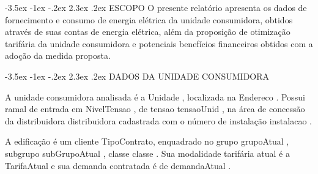 \documentclass[a4paper,12pt]{abntex2}
\makeatletter
\renewcommand\chapter{\@startsection{chapter}{0}{\z@}%
  {-3.5ex \@plus -1ex \@minus -.2ex}%
  {2.3ex \@plus.2ex}%
  {\normalfont\large\bfseries}}
\renewcommand{\arraystretch}{1.3}
\makeatother
\begin{document}
    \begin{table}[!ht]
        \centering
        \setlength{\tabcolsep}{5pt}
        \renewcommand{\arraystretch}{1.3}
    \end{table} 
    \vfill
    
    \newpage

\chapter{ESCOPO}
O presente relatório apresenta os dados de fornecimento e consumo de energia elétrica da unidade consumidora, obtidos através de suas contas de energia elétrica, além da proposição de otimização tarifária da unidade consumidora e potenciais benefícios financeiros obtidos com a adoção da medida proposta.

\chapter{DADOS DA UNIDADE CONSUMIDORA}

A unidade consumidora analisada é a {{ Unidade }}, localizada na {{ Endereco }}. Possui ramal de entrada em {{ NivelTensao }}, de {{ tensao }} {{ tensaoUnid }}, na área de concessão da distribuidora {{ distribuidora }} cadastrada com o número de instalação {{ instalacao }}.

A edificação  é  um  cliente  {{TipoContrato}}, enquadrado no grupo {{ grupoAtual }}, subgrupo {{ subGrupoAtual }}, classe {{ classe }}. Sua modalidade tarifária atual é a {{ TarifaAtual }} e sua demanda contratada é de {{ demandaAtual }}.
\end{document}
